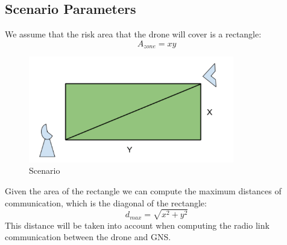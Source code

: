 \subsection{Scenario Parameters}
We assume that the risk area that the drone will cover is a rectangle:
\begin{equation*}\label{eq:scenario_parameters1} 
 		A_{zone} = xy
\end{equation*}

\begin{figure}[hb]
  	\centering
 	\includegraphics[width=0.8\textwidth]{figures/pic1.png}
  	\caption[Pipeline survey]{Scenario}
\end{figure}

Given the area of the rectangle we can compute the maximum distances of communication, which is the diagonal of the rectangle: 
\begin{equation*}\label{eq:scenario_parameters2} 
 		d_{max} = \sqrt{x^2 + y^2}
\end{equation*}
This distance will be taken into account when computing the radio link communication between the drone and GNS.
